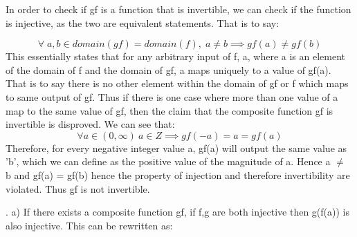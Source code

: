 \documentclass[11pt]{article}
\begin{document}
\begin{enumerate}
In order to check if gf is a function that is invertible, we can check if the function is injective, as the two are equivalent statements. That is to say: 

\begin{equation}
    \forall \; a, b \in domain(gf) = domain(f), \; a \neq b \implies gf(a) \neq gf(b)
\end{equation}
This essentially states that for any arbitrary input of f, a, where a is an element of the domain of f and the domain of gf, a maps uniquely to a value of gf(a). That is to say there is no other element within the domain of gf or f which maps to same output of gf. Thus if there is one case where more than one value of a map to the same value of gf, then the claim that the composite function gf is invertible is disproved. We can see that: 
\begin{equation}
     \forall a \in (0, \infty) \ a \in Z  \implies gf(-a) = a = gf(a) 
\end{equation}
Therefore, for every negative integer value a, gf(a) will output the same value as 'b', which we can define as the positive value of the magnitude of a. Hence a $\neq$ b  and  gf(a) = gf(b) hence the property of injection and therefore invertibility are violated. Thus gf is not invertible. 

. 
\newline a) 
\newline 
If there exists a composite function gf, if f,g are both injective then g(f(a)) is also injective. This can be rewritten as: 


\end{enumerate}
\end{document}
